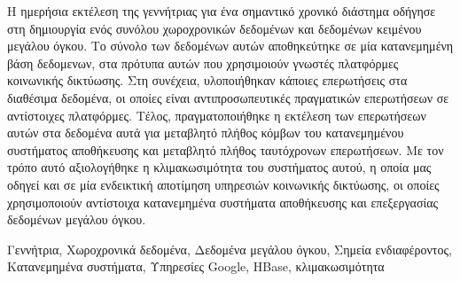 \begin{abstractgr}
Η ημερήσια εκτέλεση της γεννήτριας για ένα σημαντικό χρονικό διάστημα οδήγησε στη \linebreak δημιουργία ενός συνόλου χωροχρονικών δεδομένων και δεδομένων κειμένου μεγάλου όγκου. 
Το σύνολο των δεδομένων αυτών αποθηκεύτηκε σε μία κατανεμημένη βάση δεδομενων, στα πρότυπα αυτών που χρησιμοιούν γνωστές 
πλατφόρμες κοινωνικής δικτύωσης. Στη συνέχεια, υλοποιήθηκαν κάποιες \linebreak επερωτήσεις στα διαθέσιμα δεδομένα, οι οποίες είναι αντιπροσωπευτικές πραγματικών 
επερωτήσεων σε αντίστοιχες πλατφόρμες. Τέλος, πραγματοποιήθηκε η εκτέλεση των επερωτήσεων αυτών στα δεδομένα αυτά για μεταβλητό πλήθος 
κόμβων του κατανεμημένου συστήματος αποθήκευσης και μεταβλητό πλήθος ταυτόχρονων επερωτήσεων. Με τον τρόπο αυτό αξιολογήθηκε η κλιμακωσιμότητα του συστήματος αυτού, η οποία μας οδηγεί και σε μία 
ενδεικτική αποτίμηση υπηρεσιών κοινωνικής δικτύωσης, οι οποίες χρησιμοποιούν αντίστοιχα κατανεμημένα συστήματα αποθήκευσης και \linebreak επεξεργασίας 
δεδομένων μεγάλου όγκου.


  \begin{keywordsgr}
  Γεννήτρια, Χωροχρονικά δεδομένα, Δεδομένα μεγάλου όγκου, Σημεία ενδιαφέροντος, \linebreak Κατανεμημένα συστήματα, Υπηρεσίες Google, HBase, κλιμακωσιμότητα
  \end{keywordsgr}
\end{abstractgr}
